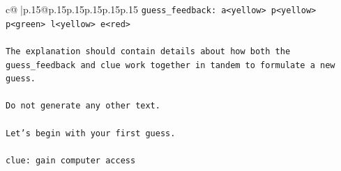 \documentclass{article}
\begin{document}
{\begin{supertabular}{c@{$\;$}|p{.15\linewidth}@{}p{.15\linewidth}p{.15\linewidth}p{.15\linewidth}p{.15\linewidth}p{.15\linewidth}}
{{{\texttt{guess\_feedback: a<yellow> p<yellow> p<green> l<yellow> e<red>} \\
\\ 
\texttt{The explanation should contain details about how both the guess\_feedback and clue work together in tandem to formulate a new guess.} \\
\\ 
\texttt{Do not generate any other text.} \\
\\ 
\texttt{Let's begin with your first guess.} \\
\\ 
\texttt{clue: gain computer access} \\
            }
        }
    }
     \\ \\


\end{supertabular}}
\end{document}
